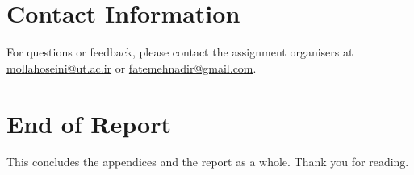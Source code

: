 \section{Contact Information}

For questions or feedback, please contact the assignment organisers at
\href{mailto:mollahoseini@ut.ac.ir}{mollahoseini@ut.ac.ir} or
\href{mailto:fatemehnadir@gmail.com}{fatemehnadir@gmail.com}.

\section{End of Report}

This concludes the appendices and the report as a whole.  Thank you
for reading.
